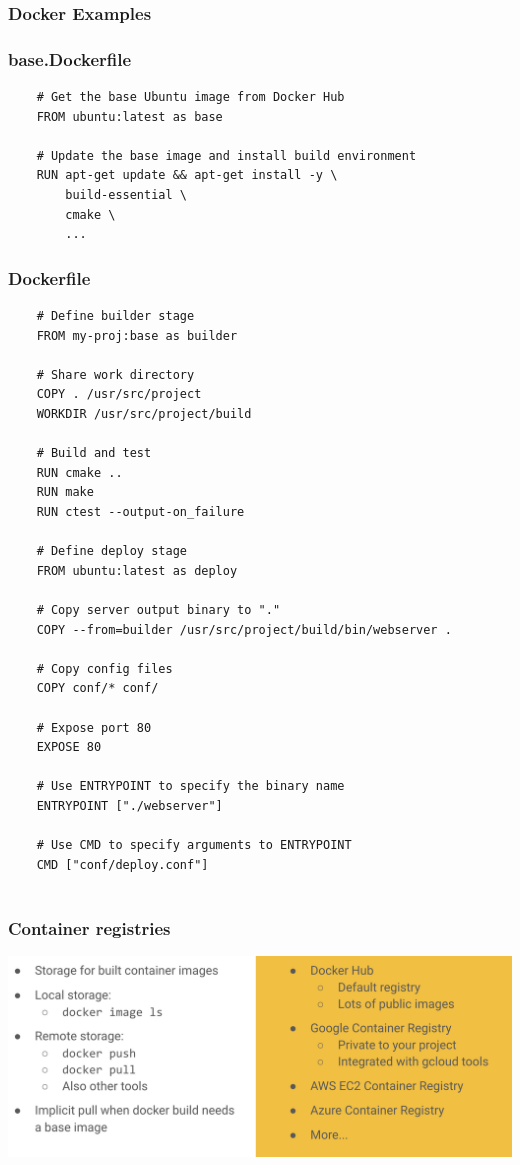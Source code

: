 \documentclass{article}
\begin{document}
\subsubsection{Docker Examples}

\subsubsection*{base.Dockerfile}

\begin{verbatim}
    # Get the base Ubuntu image from Docker Hub
    FROM ubuntu:latest as base

    # Update the base image and install build environment
    RUN apt-get update && apt-get install -y \
        build-essential \
        cmake \
        ...
\end{verbatim}

\subsubsection*{Dockerfile}
\begin{verbatim}
    # Define builder stage
    FROM my-proj:base as builder

    # Share work directory
    COPY . /usr/src/project
    WORKDIR /usr/src/project/build

    # Build and test
    RUN cmake ..
    RUN make
    RUN ctest --output-on_failure  

    # Define deploy stage
    FROM ubuntu:latest as deploy

    # Copy server output binary to "."
    COPY --from=builder /usr/src/project/build/bin/webserver .

    # Copy config files
    COPY conf/* conf/

    # Expose port 80
    EXPOSE 80

    # Use ENTRYPOINT to specify the binary name
    ENTRYPOINT ["./webserver"]

    # Use CMD to specify arguments to ENTRYPOINT
    CMD ["conf/deploy.conf"]
  
\end{verbatim}

\subsubsection{Container registries}

\includegraphics*[width=\linewidth]{containerRegistries.png}
\end{document}
